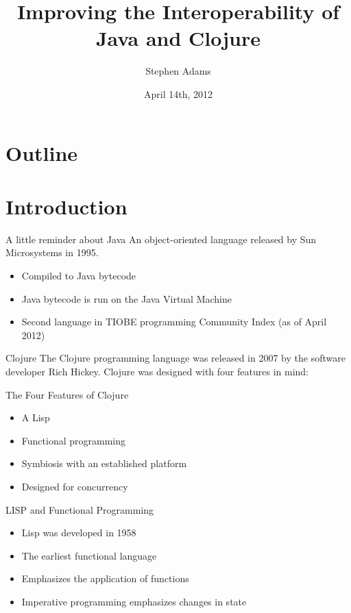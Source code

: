 \documentclass[xcolor=dvipsnames]{beamer}
\title{Improving the Interoperability of Java and Clojure}
\author{Stephen Adams}
\institute{University of Minnesota: Morris}
\date{April 14th, 2012}
\begin{document}
\begin{frame}
	\titlepage
\end{frame}

\section*{Outline}
	\section{Introduction}
	
	\begin{frame}{A little reminder about Java}
		An object-oriented language released by Sun Microsystems in 1995.
		\begin{itemize}
		\item Compiled to Java bytecode
		\item Java bytecode is run on the Java Virtual Machine
		\item Second language in TIOBE programming Community Index (as of April 2012)
		\end{itemize}
	\end{frame}
		
	\begin{frame}{Clojure}
		The Clojure programming language was released in 2007 by the software developer Rich Hickey. Clojure was designed with four features in mind:
		\pause
		\begin{block}{The Four Features of Clojure}
		\begin{itemize}
			\item A Lisp
			\item Functional programming
			\item Symbiosis with an established platform
			\item Designed for concurrency
		\end{itemize}
		\end{block}
	\end{frame}
	
	\begin{frame}{LISP and Functional Programming}
		\begin{itemize}
		\item Lisp was developed in 1958
		\item The earliest functional language
		\item Emphasizes the application of functions
		\item Imperative programming emphasizes changes in state
		\end{itemize}
	\end{frame}
	
\end{document}
